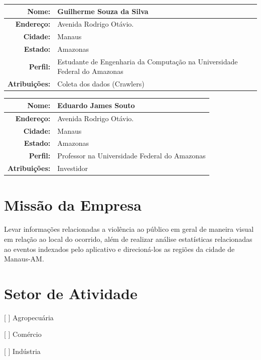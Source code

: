 \documentclass[
	12pt,				%
	openright,			%
	twoside,			%
	a4paper,			%
	english,			%
	french,				%
	spanish,			%
	brazil,				%
	]{abntex2}
\begin{document}
\begin{center}
	\begin{tabular}{|r|p{12cm}|}
		\hline
		\textbf{Nome:}		& Guilherme Souza da Silva \\ \hline
		\textbf{Endereço:}	& Avenida Rodrigo Otávio. \\ \hline
		\textbf{Cidade:}	& Manaus \\ \hline
		\textbf{Estado:}	& Amazonas \\ \hline
		\textbf{Perfil:}	& Estudante de Engenharia da Computação na Universidade Federal do Amazonas\\ \hline
		\textbf{Atribuições:}	& Coleta dos dados (Crawlers) \\ \hline
	\end{tabular}
\end{center}

\begin{center}
	\begin{tabular}{|r|p{12cm}|}
		\hline
		\textbf{Nome:}		& Eduardo James Souto \\ \hline
		\textbf{Endereço:}	& Avenida Rodrigo Otávio. \\ \hline
		\textbf{Cidade:}	& Manaus \\ \hline
		\textbf{Estado:}	& Amazonas \\ \hline
		\textbf{Perfil:}	& Professor na Universidade Federal do Amazonas \\ \hline
		\textbf{Atribuições:}	& Investidor \\ \hline
	\end{tabular}
\end{center}

\section{Missão da Empresa}

Levar informações relacionadas a violência ao público em geral de maneira visual em relação ao local do ocorrido, além de realizar análise estatísticas relacionadas ao eventos indexados pelo aplicativo e direcioná-los as regiões da cidade de Manaus-AM.

\section{Setor de Atividade}

[ ] Agropecuária

[ ] Comércio

[ ] Indústria
\end{document}

